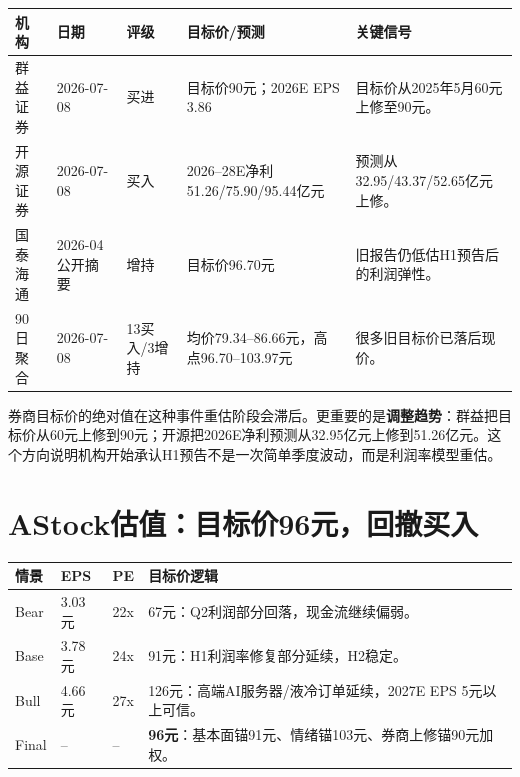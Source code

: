 \documentclass[a4paper,11pt,fontset=none]{ctexart}
\begin{document}
\begin{exhibitbox}
\begin{tabularx}{\exhibitboxwidth}{L{2.0cm}L{2.0cm}L{1.5cm}L{3.7cm}X}
\toprule
\textbf{机构} & \textbf{日期} & \textbf{评级} & \textbf{目标价/预测} & \textbf{关键信号} \\
\midrule
群益证券 & 2026-07-08 & 买进 & 目标价90元；2026E EPS 3.86 & 目标价从2025年5月60元上修至90元。 \\
开源证券 & 2026-07-08 & 买入 & 2026--28E净利51.26/75.90/95.44亿元 & 预测从32.95/43.37/52.65亿元上修。 \\
国泰海通 & 2026-04公开摘要 & 增持 & 目标价96.70元 & 旧报告仍低估H1预告后的利润弹性。 \\
90日聚合 & 2026-07-08 & 13买入/3增持 & 均价79.34--86.66元，高点96.70--103.97元 & 很多旧目标价已落后现价。 \\
\bottomrule
\end{tabularx}
\end{exhibitbox}

券商目标价的绝对值在这种事件重估阶段会滞后。更重要的是\textbf{调整趋势}：群益把目标价从60元上修到90元；开源把2026E净利预测从32.95亿元上修到51.26亿元。这个方向说明机构开始承认H1预告不是一次简单季度波动，而是利润率模型重估。

\section{AStock估值：目标价96元，回撤买入}

\begin{exhibitbox}
\begin{tabularx}{\exhibitboxwidth}{L{2.4cm}L{2.2cm}L{2.0cm}X}
\toprule
\textbf{情景} & \textbf{EPS} & \textbf{PE} & \textbf{目标价逻辑} \\
\midrule
Bear & 3.03元 & 22x & 67元：Q2利润部分回落，现金流继续偏弱。 \\
Base & 3.78元 & 24x & 91元：H1利润率修复部分延续，H2稳定。 \\
Bull & 4.66元 & 27x & 126元：高端AI服务器/液冷订单延续，2027E EPS 5元以上可信。 \\
\midrule
Final & -- & -- & \textbf{96元}：基本面锚91元、情绪锚103元、券商上修锚90元加权。 \\
\bottomrule
\end{tabularx}
\end{exhibitbox}
\end{document}
